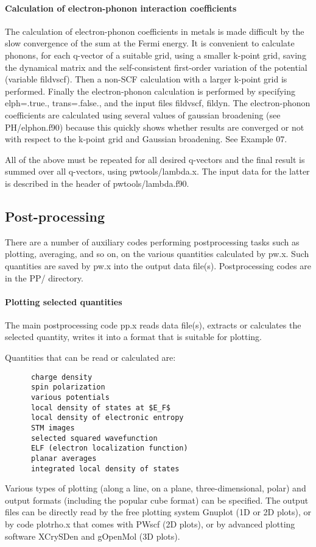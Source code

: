 \documentclass[12pt,a4paper]{article}
\begin{document}
\paragraph{Calculation of electron-phonon interaction coefficients}

The calculation of electron-phonon coefficients in metals is made difficult by
the slow convergence of the sum at the Fermi energy. It is convenient to 
calculate phonons, for each q-vector of a suitable grid, using a
smaller k-point 
grid, saving the dynamical matrix and the self-consistent first-order variation
of the potential (variable fildvscf). Then a non-SCF calculation with
a larger k-point grid is performed. Finally the electron-phonon calculation is
performed by specifying elph=.true., trans=.false., and the input files
fildvscf, fildyn. The electron-phonon coefficients are calculated using several
values of gaussian broadening (see PH/elphon.f90) because this quickly
shows whether results are converged or not with respect to the k-point grid
and Gaussian broadening. See Example 07.

All of the above must be repeated for all desired q-vectors and the final
result is summed over all q-vectors, using pwtools/lambda.x. The input
data for the latter is described in the header of pwtools/lambda.f90.

\subsection{Post-processing}

There are a number of auxiliary codes performing postprocessing tasks such
as plotting, averaging, and so on, on the various quantities calculated by
pw.x. Such quantities are saved by pw.x into the output data file(s). 
Postprocessing codes are in the PP/ directory.

\paragraph{Plotting selected quantities}
  
The main postprocessing code pp.x reads data file(s), extracts or calculates 
the selected quantity, writes it into a format that is suitable for plotting.

Quantities that can be read or calculated are:
\begin{verbatim}
      charge density
      spin polarization
      various potentials
      local density of states at $E_F$
      local density of electronic entropy
      STM images
      selected squared wavefunction
      ELF (electron localization function)
      planar averages
      integrated local density of states
\end{verbatim}
Various types of plotting (along a line, on a plane, three-dimensional, polar)
and output formats (including the popular cube format) can be specified.
The output files can be directly read by the free plotting system Gnuplot
(1D or 2D plots), or by code plotrho.x that comes with PWscf (2D plots),
or by advanced plotting software XCrySDen and gOpenMol (3D plots).
\end{document}
